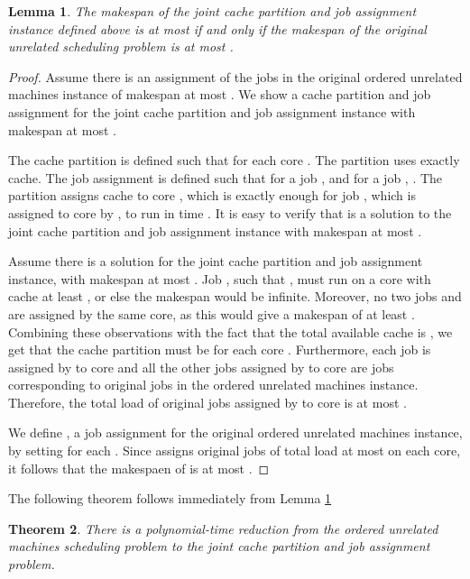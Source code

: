 \documentclass[11pt]{article}
\newtheorem{theorem}{Theorem}[section]
\newtheorem{lemma}[theorem]{Lemma}
\begin{document}
\begin{lemma} \label{reduce}
The makespan of the joint cache partition and job assignment instance defined above is at most  if and only if the makespan of the original unrelated scheduling problem is at most .
\end{lemma}
\begin{proof}
Assume there is an assignment  of the jobs in the original ordered  unrelated machines instance of makespan at most .
We show a cache partition  and job assignment  for the joint cache partition and job assignment instance with makespan at most .

The cache partition  is defined such that  for each core . The partition  uses exactly  cache.
The job  assignment  is defined such that for
 a job ,  and for a job , . The partition  assigns  cache to
core , which is exactly enough for job , which is assigned to core  by , to run in time .
It is easy to verify that  is a solution to the joint cache partition and job assignment instance with makespan at most .

Assume there is a solution   for the joint cache partition and job assignment instance, with makespan at most .
Job , such that , must run on a core with cache at least , or else the makespan would be infinite.
Moreover, no two jobs  and  are assigned by  the same core, as this would give a makespan of at least .
Combining these observations with the fact that the total available cache is , we get that the cache partition must be  for each core .
Furthermore, each job  is assigned by  to core  and all the other jobs assigned by  to core  are jobs
corresponding to original jobs in the ordered unrelated machines instance. Therefore, the total load of original jobs assigned by  to core  is at most .

We define , a job assignment for the original ordered unrelated machines instance, by setting  for each .
Since  assigns original jobs of total load at most  on each core, it follows that the makespaen of  is at most .
\end{proof}

The following theorem follows immediately from Lemma \ref{reduce}
\begin{theorem}
There is a polynomial-time reduction from the ordered unrelated machines scheduling problem to the joint cache partition and job assignment problem.
\end{theorem}
\end{document}
